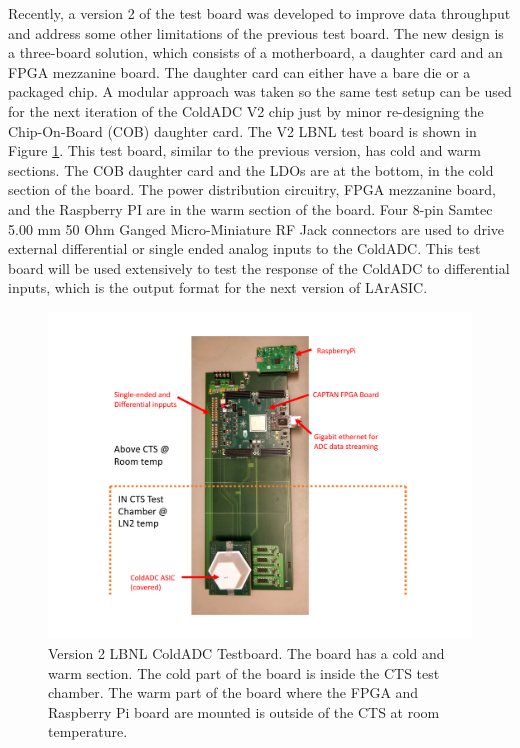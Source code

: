 Recently, a version 2 of the test board was developed to improve data throughput and address some other limitations 
of the previous test board.  The new design is a three-board 
solution, which consists of a motherboard, a daughter card and an FPGA mezzanine board. The daughter card can either have a 
bare die or a packaged chip. A modular approach was taken so the same test setup 
can be used for the next iteration of the ColdADC V2 chip just by minor re-designing the Chip-On-Board (COB) daughter card. The V2 LBNL 
test board is shown in Figure \ref{fig:v2_board}. This test board, similar to the previous version, has cold and warm 
sections. The COB daughter card and the LDOs are at the bottom, in the cold section of the board. The power 
distribution circuitry, FPGA mezzanine board, and the Raspberry PI are in the warm section of the board. 
Four 8-pin Samtec 5.00 mm 50 Ohm Ganged Micro-Miniature RF Jack connectors are used to drive external 
differential or single ended analog inputs to the ColdADC. This test board will be used extensively to test
the response of the ColdADC to differential inputs, which is the output format for the next version of LArASIC.
\begin{figure}[!ht]
\centering
 \includegraphics[width=1.0\linewidth]{figures/prakash_fig/TestBoard2_CTS.pdf}
  \caption[LBNL ColdADC Testboard]{Version 2 LBNL ColdADC Testboard. The board has a cold and warm section. The
cold part of the board is inside the CTS test chamber. The warm part of the board where the FPGA and Raspberry Pi board are mounted is outside of the CTS at room temperature.}
  \label{fig:v2_board}
\end{figure}


